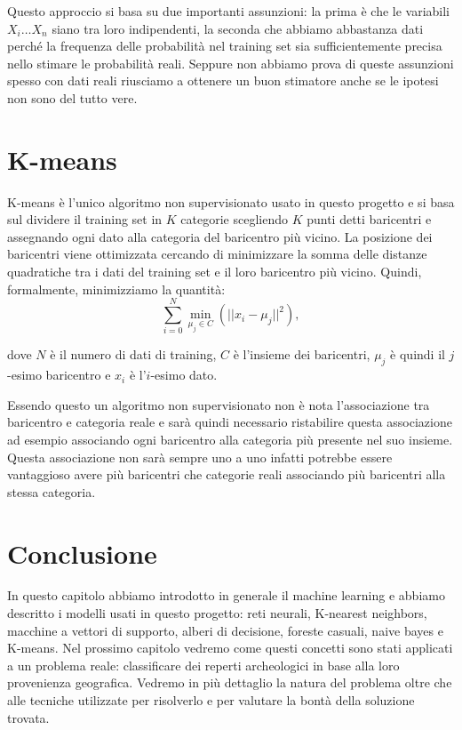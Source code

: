 \documentclass[a4paper,12pt]{report}
\begin{document}
Questo approccio si basa su due importanti assunzioni: la prima è che le
variabili $X_i \dots X_n$ siano tra loro indipendenti, la seconda che abbiamo
abbastanza dati perché la frequenza delle probabilità nel training set sia
sufficientemente precisa nello stimare le probabilità reali. Seppure non abbiamo
prova di queste assunzioni spesso con dati reali riusciamo a ottenere un buon
stimatore anche se le ipotesi non sono del tutto vere.

\section{K-means}

K-means è l'unico algoritmo non supervisionato usato in questo progetto e si
basa sul dividere il training set in $K$ categorie scegliendo $K$ punti detti
baricentri e assegnando ogni dato alla categoria del baricentro più vicino. La
posizione dei baricentri viene ottimizzata cercando di minimizzare la somma
delle distanze quadratiche tra i dati del training set e il loro baricentro più
vicino. Quindi, formalmente, minimizziamo la quantità:
$$
\sum_{i=0}^{N}\min_{\mu_j \in C}(||x_i - \mu_j||^2),
$$

dove $N$ è il numero di dati di training, $C$ è l'insieme dei baricentri,
$\mu_j$ è quindi il $j$-esimo baricentro e $x_i$ è l'$i$-esimo dato.

Essendo questo un algoritmo non supervisionato non è nota l'associazione tra
baricentro e categoria reale e sarà quindi necessario ristabilire questa
associazione ad esempio associando ogni baricentro alla categoria più presente
nel suo insieme. Questa associazione non sarà sempre uno a uno infatti potrebbe
essere vantaggioso avere più baricentri che categorie reali associando più
baricentri alla stessa categoria.

\section{Conclusione} %
In questo capitolo abbiamo introdotto in generale il machine learning e abbiamo
descritto i modelli usati in questo progetto: reti neurali, K-nearest neighbors,
macchine a vettori di supporto, alberi di decisione, foreste casuali, naive
bayes e K-means. Nel prossimo capitolo vedremo come questi concetti sono stati
applicati a un problema reale: classificare dei reperti archeologici in base
alla loro provenienza geografica. Vedremo in più dettaglio la natura del
problema oltre che alle tecniche utilizzate per risolverlo e per valutare la
bontà della soluzione trovata.
% 
% 
\end{document}
